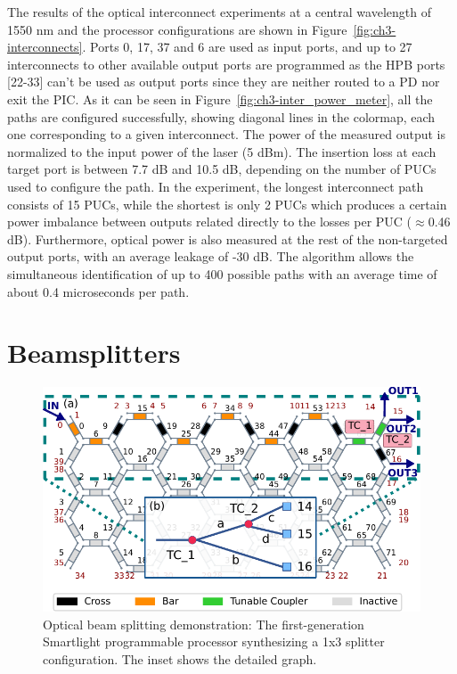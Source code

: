 The results of the optical interconnect experiments at a central wavelength of 1550 nm and the processor configurations are shown in Figure~\ref{fig:ch3-interconnects}.
Ports 0, 17, 37 and 6 are used as input ports, and up to 27 interconnects to other available output ports are programmed as the HPB ports [22-33] can't be used as output ports since they are neither routed to a PD nor exit the PIC.
As it can be seen in Figure~\ref{fig:ch3-inter_power_meter}, all the paths are configured successfully, showing diagonal lines in the colormap, each one corresponding to a given interconnect.
The power of the measured output is normalized to the input power of the laser (5 dBm).
The insertion loss at each target port is between 7.7 dB and 10.5 dB, depending on the number of PUCs used to configure the path.
In the experiment, the longest interconnect path consists of 15 PUCs, while the shortest is only 2 PUCs which produces a certain power imbalance between outputs related directly to the losses per PUC (\(\approx\)0.46 dB).
Furthermore, optical power is also measured at the rest of the non-targeted output ports, with an average leakage of -30 dB.
The algorithm allows the simultaneous identification of up to 400 possible paths with an average time of about 0.4 microseconds per path.

\section{Beamsplitters}\label{sec:beam_splitters} %

\begin{figure}
	\begin{center}
		\includegraphics{figures/ch3-splitter.pdf}
	\end{center}
	\caption{Optical beam splitting demonstration: The first-generation Smartlight programmable processor synthesizing a 1x3 splitter configuration.
		The inset shows the detailed graph.
	}\label{fig:ch3-splitter}
\end{figure}

